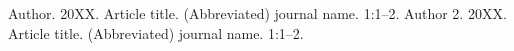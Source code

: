 \documentclass[oupdraft]{sysbio}
\begin{document}


\bigskip\bigskip




\begin{thebibliography}{39}
Author. 20XX. Article title. (Abbreviated) journal name. 1:1--2.
Author 2. 20XX. Article title. (Abbreviated) journal name. 1:1--2.
\end{thebibliography}






\end{document}

